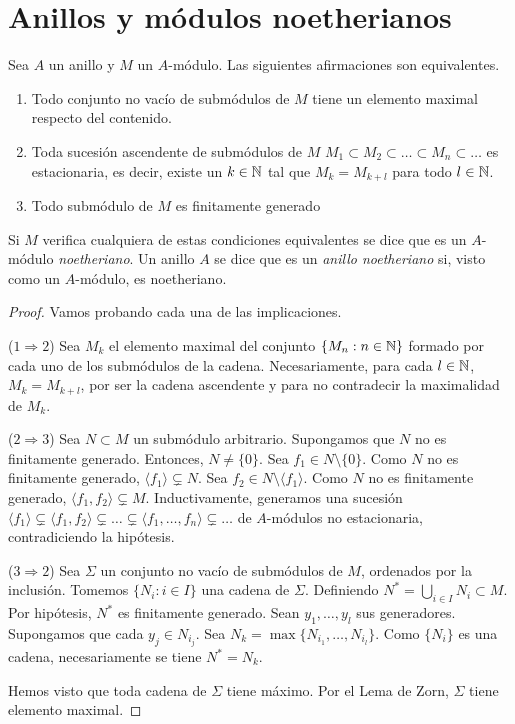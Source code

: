 \documentclass[../main.tex]{subfiles}
\begin{document}
	\section{Anillos y módulos noetherianos}
	\begin{proposition}
		Sea $A$ un anillo y $M$ un $A$-módulo. Las siguientes afirmaciones son equivalentes.\begin{enumerate}
			\item Todo conjunto no vacío de submódulos de $M$ tiene un elemento maximal respecto del contenido.
			\item Toda sucesión ascendente de submódulos de $M$ $M_1\subset M_2\subset\dots\subset M_n\subset\dots$ es estacionaria, es decir, existe un $k\in\mathbb{N}$ tal que $M_k=M_{k+l}$ para todo $l\in\mathbb{N}$.
			\item Todo submódulo de $M$ es finitamente generado
		\end{enumerate}
		Si $M$ verifica cualquiera de estas condiciones equivalentes se dice que es un $A$-módulo \textit{noetheriano}. Un anillo $A$ se dice que es un \textit{anillo noetheriano} si, visto como un $A$-módulo, es noetheriano.
	\end{proposition}
	\begin{proof} Vamos probando cada una de las implicaciones.
		
		($1\Rightarrow 2$) Sea $M_k$ el elemento maximal del conjunto $\{M_n:n\in\mathbb{N}\}$ formado por cada uno de los submódulos de la cadena. Necesariamente, para cada $l\in\mathbb{N}$, $M_k=M_{k+l}$, por ser la cadena ascendente y para no contradecir la maximalidad de $M_k$.
		
		($2\Rightarrow 3$) Sea $N\subset M$ un submódulo arbitrario. Supongamos que $N$ no es finitamente generado. Entonces, $N\neq\{0\}$. Sea $f_1\in N\setminus\{0\}$. Como $N$ no es finitamente generado, $\langle f_1\rangle\varsubsetneq N$. Sea $f_2\in N\setminus\langle f_1\rangle$. Como $N$ no es finitamente generado, $\langle f_1,f_2\rangle\varsubsetneq M$. Inductivamente, generamos una sucesión $\langle f_1\rangle\varsubsetneq\langle f_1,f_2\rangle\varsubsetneq\dots\varsubsetneq\langle f_1,\dots,f_n\rangle\varsubsetneq\dots$ de $A$-módulos no estacionaria, contradiciendo la hipótesis.
		
		($3\Rightarrow 2$) Sea $\Sigma$ un conjunto no vacío de submódulos de $M$, ordenados por la inclusión. Tomemos $\{N_i:i\in I\}$ una cadena de $\Sigma$. Definiendo $N^{\ast}=\bigcup_{i\in I}N_i\subset M$. Por hipótesis, $N^{\ast}$ es finitamente generado. Sean $y_1,\dots,y_l$ sus generadores. Supongamos que cada $y_j\in N_{i_j}$. Sea $N_k=\operatorname{max}\{N_{i_1},\dots,N_{i_l}\}$. Como $\{N_i\}$ es una cadena, necesariamente se tiene $N^{\ast}=N_k$. 
		
		Hemos visto que toda cadena de $\Sigma$ tiene máximo. Por el Lema de Zorn, $\Sigma$ tiene elemento maximal.
	\end{proof}
\end{document}
